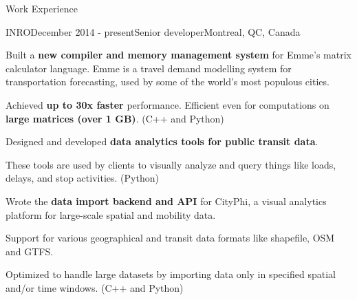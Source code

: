 \documentclass{resume} %
\begin{document}
\begin{rSection}{Work Experience}

\begin{rSubsection}{INRO}{December 2014 - present}{Senior developer}{Montreal,
        QC, Canada}
\item Built a \textbf{new compiler and memory management system} for Emme's
        matrix calculator language. Emme is a travel demand modelling system
        for transportation forecasting, used by some of the world's most
        populous cities.
\begin{lsubSubsection} 
\item Achieved \textbf{up to 30x faster} performance. Efficient even for
        computations on \textbf{large matrices (over 1 GB)}. (C++ and Python)
\end{lsubSubsection}
\item Designed and developed \textbf{data analytics tools for public transit
        data}.
\begin{lsubSubsection}
\item These tools are used by clients to visually analyze and query things like
        loads, delays, and stop activities. (Python)
\end{lsubSubsection}
\item Wrote the \textbf{data import backend and API} for CityPhi, a
        visual analytics platform for large-scale spatial and mobility data.
\begin{lsubSubsection}
\item Support for various geographical and transit data formats like shapefile,
        OSM and GTFS.
\item Optimized to handle large datasets by importing data only in specified
        spatial and/or time windows. (C++ and Python)
\end{lsubSubsection}
\end{rSubsection}


\end{rSection}
\end{document}
